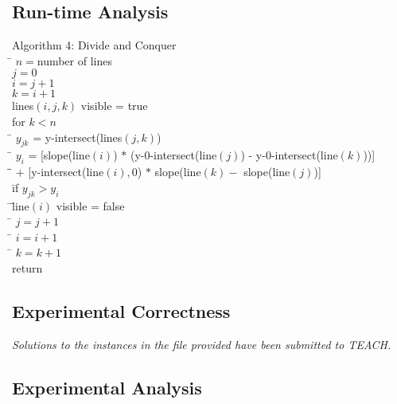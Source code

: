 \documentclass{article}
\begin{document}
\subsection*{Run-time Analysis}


\begin{tabbing}
  {\sc Algorithm 4: Divide and Conquer}\\
  \qquad \= $n = $number of lines \\
  \> $j = 0$ \\
  \> $i = j+1$\\
  \> $k = i+1$\\
  \> lines$(i,j,k)$ visible = true\\
  \> for $k < n$\\
  \> \qquad \= $y_{jk}$ = y-intersect(lines$(j,k)$)\\
  \> \qquad \= $y_{i}$ = [slope(line$(i)$) $*$ (y-0-intersect(line$(j)$) - y-0-intersect(line$(k)$))]\\
  \> \qquad \= \qquad \= $+$  [y-intersect(line$(i),0$) $*$ slope(line$(k) -$ slope(line$(j)$)]\\ 
  \> \qquad \= if $y_{jk} > y_{i}$\\
  \> \qquad \= \qquad \= line$(i)$ visible = false\\
  \> \qquad \= $j = j+1$\\
  \> \qquad \= $i = i+1$\\
  \> \qquad \= $k = k+1$\\
  \> return
\end{tabbing}

\subsection*{Experimental Correctness}

\emph{Solutions to the instances in the file provided have been submitted to TEACH.}

\subsection*{Experimental Analysis}
\end{document}
